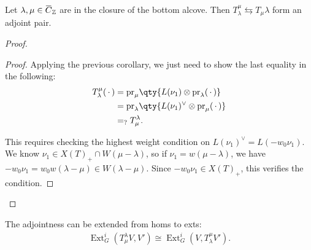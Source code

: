 \begin{theorem}[?]

\begin{theorem}[?]

Let
\(\lambda, \mu \in \mkern 1.5mu\overline{\mkern-1.5muC\mkern-1.5mu}\mkern 1.5mu_{\mathbb{Z}}\)
are in the closure of the bottom alcove. Then
\(T_\lambda^\mu \leftrightarrows T_\mu \lambda\) form an adjoint pair.

\end{theorem}

\end{theorem}

\begin{proof}

\begin{proof}

Applying the previous corollary, we just need to show the last equality
in the following:
\begin{align*}   T_\lambda^\mu({\,\cdot\,})  &= {\operatorname{pr}}_\mu \qty{ L(\nu_1) \otimes{\operatorname{pr}}_\lambda({\,\cdot\,}) } \\ &= {\operatorname{pr}}_\lambda \qty{ L(\nu_1)^\vee\otimes{\operatorname{pr}}_\mu({\,\cdot\,}) } \\ &=_? T_\mu^\lambda .\end{align*}

This requires checking the highest weight condition on
\(L(\nu_1)^\vee= L(-w_0 \nu_1)\). We know
\(\nu_1 \in X(T)_+ \cap W(\mu-\lambda)\), so if
\(\nu_1 = w(\mu-\lambda)\), we have
\(-w_0 \nu_1 = w_0 w (\lambda - \mu) \in W(\lambda - \mu)\). Since
\(-w_0 \nu_1 \in X(T)_+\), this verifies the condition.

\end{proof}

\end{proof}

\begin{remark}

\begin{remark}

The adjointness can be extended from homs to exts:
\begin{align*}   \operatorname{Ext}_G^i(T_\mu^\lambda V, V' ) \cong \operatorname{Ext}_G^i(V, T_\lambda^\mu V') .\end{align*}

\end{remark}

\end{remark}

